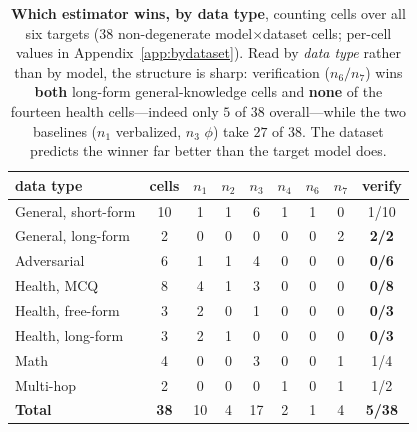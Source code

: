 \documentclass[11pt]{article}
\begin{document}
\begin{table}[t]
\centering\small
\setlength{\tabcolsep}{3.5pt}
\begin{tabular}{lc cccccc c}
\toprule
data type & cells & $n_1$ & $n_2$ & $n_3$ & $n_4$ & $n_6$ & $n_7$ & verify \\
\midrule
General, short-form & 10 & 1 & 1 & 6 & 1 & 1 & 0 & 1/10 \\
General, long-form  &  2 & 0 & 0 & 0 & 0 & 0 & 2 & \textbf{2/2} \\
Adversarial         &  6 & 1 & 1 & 4 & 0 & 0 & 0 & \textbf{0/6} \\
Health, MCQ         &  8 & 4 & 1 & 3 & 0 & 0 & 0 & \textbf{0/8} \\
Health, free-form   &  3 & 2 & 0 & 1 & 0 & 0 & 0 & \textbf{0/3} \\
Health, long-form   &  3 & 2 & 1 & 0 & 0 & 0 & 0 & \textbf{0/3} \\
Math                &  4 & 0 & 0 & 3 & 0 & 0 & 1 & 1/4 \\
Multi-hop           &  2 & 0 & 0 & 0 & 1 & 0 & 1 & 1/2 \\
\midrule
\textbf{Total}      & \textbf{38} & 10 & 4 & 17 & 2 & 1 & 4 & \textbf{5/38} \\
\bottomrule
\end{tabular}
\caption{\textbf{Which estimator wins, by data type}, counting cells over all six targets
(38 non-degenerate model$\times$dataset cells; per-cell values in
Appendix~\ref{app:bydataset}). Read by \emph{data type} rather than by model, the structure is
sharp: verification ($n_6/n_7$) wins \textbf{both} long-form general-knowledge cells and
\textbf{none} of the fourteen health cells---indeed only $5$ of $38$ overall---while the two
baselines ($n_1$ verbalized, $n_3$ $\phi$) take $27$ of $38$. The dataset predicts the winner far better than the target
model does.}
\label{tab:groups}
\end{table}
\end{document}
